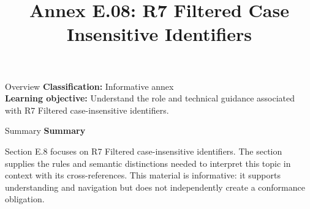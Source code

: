 \documentclass[10pt,letterpaper]{article}
\title{Annex E.08: R7 Filtered Case Insensitive Identifiers}
\author{}
\date{}
\begin{document}
\maketitle
\begin{CornellOverviewBox}{Overview}
\textbf{Classification:} Informative annex\\[2pt]
\textbf{Learning objective:} Understand the role and technical guidance associated with R7 Filtered case-insensitive identifiers.
\end{CornellOverviewBox}\begin{CornellSummaryBox}{Summary}
{\sffamily\bfseries\color{Accent} Summary}\par\vspace{3pt}Section E.8 focuses on R7 Filtered case-insensitive identifiers. The section supplies the rules and semantic distinctions needed to interpret this topic in context with its cross-references. This material is informative: it supports understanding and navigation but does not independently create a conformance obligation.
\end{CornellSummaryBox}
\end{document}
